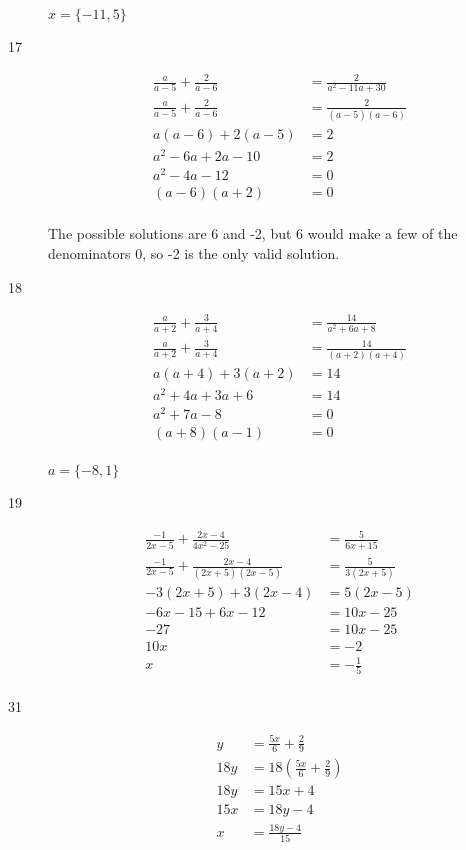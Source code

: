 \documentclass[fleqn,addpoints]{exam}
\begin{document}
\begin{description}
\( x = \{ -11, 5 \} \)

\item[17]
\begin{align*}
  \frac{a}{a-5} + \frac{2}{a-6} &= \frac{2}{a^2-11a+30} \\
  \frac{a}{a-5} + \frac{2}{a-6} &= \frac{2}{(a-5)(a-6)} \\
  a(a-6) + 2(a-5) &= 2 \\
  a^2-6a+2a-10 &= 2 \\
  a^2-4a-12 &= 0 \\
  (a-6)(a+2) &= 0 \\
\end{align*}

The possible solutions are 6 and -2, but 6 would make a few of the denominators 0, so -2 is the only valid solution.

\item[18]
\begin{align*}
  \frac{a}{a+2} + \frac{3}{a+4} &= \frac{14}{a^2+6a+8} \\
  \frac{a}{a+2} + \frac{3}{a+4} &= \frac{14}{(a+2)(a+4)} \\
  a(a+4) + 3(a+2) &= 14 \\
  a^2 + 4a + 3a + 6 &= 14 \\
  a^2 + 7a - 8 &= 0 \\
  (a+8)(a-1) &= 0 \\
\end{align*}

\( \displaystyle a = \{ -8, 1 \} \)

\item[19]
\begin{align*}
  \frac{-1}{2x-5} + \frac{2x-4}{4x^2-25} &= \frac{5}{6x+15} \\
  \frac{-1}{2x-5} + \frac{2x-4}{(2x+5)(2x-5)} &= \frac{5}{3(2x+5)} \\
  -3(2x+5) + 3(2x-4) &= 5(2x-5) \\
  -6x-15 + 6x-12 &= 10x-25 \\
  -27 &= 10x-25 \\
  10x &= -2 \\
  x &= -\frac{1}{5} \\
\end{align*}

\item[31]
\begin{align*}
  y &= \frac{5x}{6} + \frac{2}{9} \\
  18y &= 18 \left( \frac{5x}{6} + \frac{2}{9} \right) \\
  18y &= 15x + 4 \\
  15x &= 18y - 4 \\
  x &= \frac{18y - 4}{15} \\
\end{align*}


\end{description}
\end{document}
